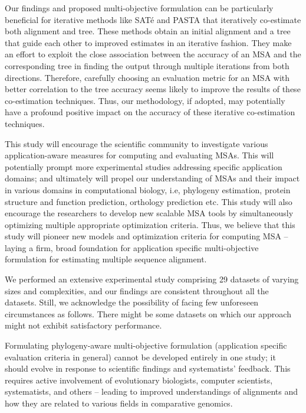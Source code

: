 Our findings and proposed multi-objective formulation can be particularly beneficial for iterative methods like SAT\'e and PASTA that iteratively co-estimate both alignment and tree. These methods obtain an initial alignment and a tree that guide each other to improved estimates in an iterative fashion. They make an effort to exploit the close association between the accuracy of an MSA and the corresponding tree in finding the output through multiple iterations from both directions. Therefore, carefully choosing an evaluation metric for an MSA with better correlation to the tree accuracy seems likely to improve the results of these co-estimation techniques. Thus, our methodology, if adopted, may potentially have a profound positive impact on the accuracy of these iterative co-estimation techniques.

This study will encourage the scientific community to investigate various application-aware measures for computing and evaluating MSAs. This will potentially prompt more experimental studies addressing specific application domains; and ultimately will propel our understanding of MSAs and their impact in various domains in computational biology, i.e, phylogeny estimation, protein structure and function prediction, orthology prediction etc. This study will also encourage the researchers to develop new scalable MSA tools by simultaneously optimizing multiple appropriate optimization criteria. Thus, we believe that this study will pioneer new models and optimization criteria for computing MSA -- laying a firm, broad foundation for application specific multi-objective formulation for estimating multiple sequence alignment.

We performed an extensive experimental study comprising 29 datasets of varying sizes and complexities, and our findings are consistent throughout all the datasets. Still, we acknowledge the possibility of facing few unforeseen circumstances as follows. There might be some datasets on which our approach might not exhibit satisfactory performance. %

Formulating phylogeny-aware multi-objective formulation (application specific evaluation criteria in general) cannot be developed entirely in one study; it should evolve in response to scientific findings and systematists' feedback. This requires active involvement of evolutionary biologists, computer scientists, systematists, and others -- leading to improved understandings of alignments and how they are related to various fields in comparative genomics.

